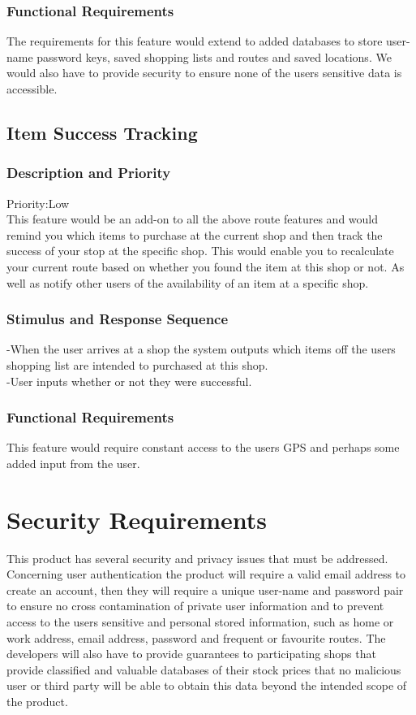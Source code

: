\documentclass[12pt]{article}
\begin{document}
 \subsubsection{Functional Requirements}
The requirements for this feature would extend to added databases to store user-name password keys,  saved shopping lists and routes and saved locations. We would also have to provide security to ensure none of the users sensitive data is accessible. 

 \subsection{Item Success Tracking}
\subsubsection{Description and Priority}
 Priority:Low\\
 This feature would be an add-on to all the above route features and would remind you which items to purchase at the current shop and then track the success of your stop at the specific shop. This would enable you to recalculate your current route based on whether you found the item at this shop or not. As well as notify other users of the availability of an item at a specific shop.  
 \subsubsection{Stimulus and Response Sequence}
-When the user arrives at a shop the system outputs which items off  the users shopping list are intended to purchased at this shop.\\
-User  inputs whether or not they were successful.
 \subsubsection{Functional Requirements}
 This feature would require constant access to the users GPS and perhaps some added input from the user.
 
 \section{Security Requirements}
 This product has several security and privacy issues that must be addressed. Concerning user authentication the product will require a valid email address to create an account, then they will require a unique user-name and password pair to ensure no cross contamination of private user information and to prevent access to the users sensitive and personal stored information, such as home or work address, email address, password and frequent or favourite routes. The developers will also have to provide guarantees to participating shops that provide classified and valuable databases of their stock prices that no malicious user or third party will be able to obtain this data beyond the intended scope of the product. 
 
\end{document}
